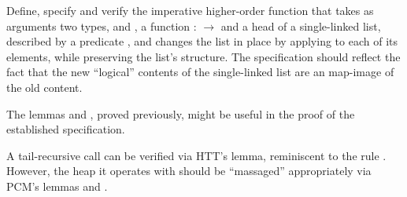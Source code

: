 \begin{exercise} 
Define, specify and verify the imperative higher-order function
 that takes as arguments two types,  and , a function 
:  \ensuremath{\rightarrow}  and a head  of a single-linked list, described by a
predicate , and changes the list in place by applying  to
each of its elements, while preserving the list's structure. The
specification should reflect the fact that the new ``logical'' contents
of the single-linked list are an  map-image of the old content.


\hint The lemmas  and , proved previously,
 might be useful in the proof of the established specification.


\hint A tail-recursive call can be verified via HTT's 
 lemma, reminiscent to the rule . However, the heap it
 operates with should be ``massaged'' appropriately via PCM's lemmas
  and .


\end{exercise}
\begin{coqdoccode}
\coqdocemptyline
\coqdocemptyline
\end{coqdoccode}
